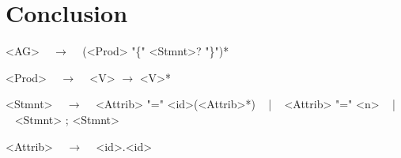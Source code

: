\chapter{Conclusion}






\newsavebox{\agdef}
\begin{lrbox}{\agdef}%
\begin{minipage}{1\columnwidth}
\setlength{\grammarparsep}{0.15cm}   %
\setlength{\grammarindent}{1cm}
\renewcommand{\litleft}{\bfseries}
\renewcommand{\ulitleft}{\bfseries}
\renewcommand{\superscript}[1]{\ensuremath{^{\textrm{#1}}}}
\renewcommand{\subscript}[1]{\ensuremath{_{\textrm{\uppercase{#1}}}}}
\renewcommand{\syntleft}{\normalfont\itshape}
\renewcommand{\syntright}{}
\renewcommand{\deriv}{~ $\rightarrow$ ~}
\begin{grammar}
<AG> \deriv{} (<Prod> "\{" <Stmnt>? "\}")*

<Prod> \deriv{} <V> $\rightarrow$ <V>*

<Stmnt> \deriv{} <Attrib> "=" <id>(<Attrib>*) ~  | ~ <Attrib> "=" <n> ~ | ~ <Stmnt> ; <Stmnt> 

<Attrib> \deriv{} <id>.<id>
\end{grammar}
\end{minipage}
\end{lrbox}



